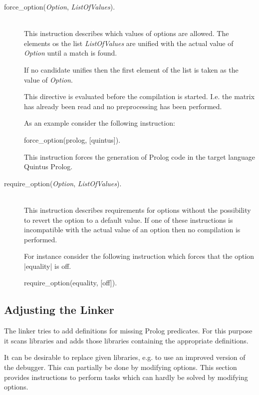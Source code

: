 \begin{description}
  \item [force\_option({\em Option}, {\em
  ListOfValues}).]\ \\
	This instruction describes which values of options are allowed. The
	elements os the list {\em ListOfValues} are unified with the actual
	value of {\em Option} until a match is found. 

	If no candidate unifies then the first element of the list is taken as
	the value of {\em Option}.

	This directive is evaluated before the compilation is started.
	I.e. the matrix has already been read and no preprocessing has been
	performed. 

	As an example consider the following instruction:

\begin{BoxedSample}
  force\_option(prolog, [quintus]).
\end{BoxedSample}

	This instruction forces the generation of Prolog code in the target
	language Quintus Prolog.

  \item [require\_option({\em Option}, {\em ListOfValues}).]%
	\label{require_option}\ \\
	This instruction describes requirements for options without the
	possibility to revert the option to a default value. 
	If one of these instructions is incompatible with the actual value of
	an option then no compilation is performed.

	For instance consider the following instruction which forces that the
	option |equality| is off.

\begin{BoxedSample}
  require\_option(equality, [off]).
\end{BoxedSample}

\end{description}


\subsection{Adjusting the Linker}

The linker tries to add definitions for missing Prolog predicates. For this
purpose it scans libraries and adds those libraries containing the appropriate
definitions. 

It can be desirable to replace given libraries, e.g. to use an improved
version of the debugger. This can partially be done by modifying options. This
section provides instructions to perform tasks which can hardly be solved by
modifying options.

